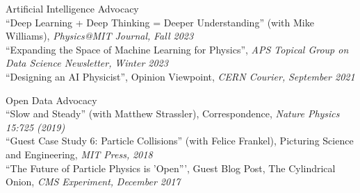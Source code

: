 \item Artificial Intelligence Advocacy\\ ``Deep Learning + Deep Thinking = Deeper Understanding'' (with Mike Williams), \emph{Physics@MIT Journal,} \emph{Fall 2023}
\\ ``Expanding the Space of Machine Learning for Physics'', \emph{APS Topical Group on Data Science Newsletter,} \emph{Winter 2023}
\\ ``Designing an AI Physicist'', Opinion Viewpoint, \emph{CERN Courier,} \emph{September 2021}
\item Open Data Advocacy\\ ``Slow and Steady'' (with Matthew Strassler), Correspondence, \emph{Nature Physics 15:725 (2019)}
\\ ``Guest Case Study 6:  Particle Collisions'' (with Felice Frankel), Picturing Science and Engineering, \emph{MIT Press,} \emph{2018}
\\ ``The Future of Particle Physics is 'Open''', Guest Blog Post, The Cylindrical Onion, \emph{CMS Experiment,} \emph{December 2017}
